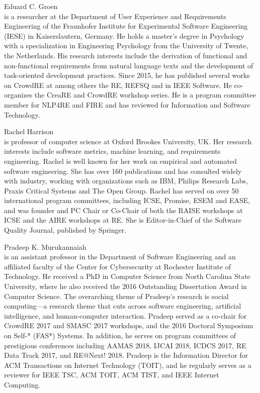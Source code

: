 \documentclass[conference,9pt]{IEEEtran}
\begin{document}
\begin{LaTeXdescription}

\item[Eduard C. Groen] \hfill\\ is a researcher at the Department of User Experience and Requirements Engineering of the Fraunhofer Institute for Experimental Software Engineering (IESE) in Kaiserslautern, Germany. He holds a master's degree in Psychology with a specialization in Engineering Psychology from the University of Twente, the Netherlands. His research interests include the derivation of functional and non-functional requirements from natural language texts and the development of task-oriented development practices. Since 2015, he has published several works on CrowdRE at among others the RE, REFSQ and in IEEE Software. He co-organizes the CreaRE and CrowdRE workshop series. He is a program committee member for NLP4RE and FIRE and has reviewed for Information and Software Technology.

\item[Rachel Harrison ] \hfill \\ is professor of computer science at Oxford Brookes University, UK. Her research interests include software metrics, machine learning, and requirements engineering. Rachel is well known for her work on empirical and automated software engineering. She has over 160 publications and has consulted widely with industry, working with organizations such as IBM, Philips Research Labs, Praxis Critical Systems and The Open Group. Rachel has served on over 50 international program committees, including ICSE, Promise, ESEM and EASE, and was founder and PC Chair or Co-Chair of both the RAISE workshops at ICSE and the AIRE workshops at RE. She is Editor-in-Chief of the Software Quality Journal, published by Springer.

\item[Pradeep K. Murukannaiah] \hfill\\ is an assistant professor in the Department of Software Engineering and an affiliated faculty of the Center for Cybersecurity at Rochester Institute of Technology. He received a PhD in Computer Science from North Carolina State University, where he also received the 2016 Outstanding Dissertation Award in Computer Science. The overarching theme of Pradeep's research is social computing---a research theme that cuts across software engineering, artificial intelligence, and human-computer interaction. Pradeep served as a co-chair for CrowdRE 2017 and SMASC 2017 workshops, and the 2016 Doctoral Symposium on Self-* (FAS*) Systems. In addition, he serves on program committees of prestigious conferences including AAMAS 2018, IJCAI 2018, ICDCS 2017, RE Data Track 2017, and RE@Next! 2018. Pradeep is the Information Director for ACM Transactions on Internet Technology (TOIT), and he regularly serves as a reviewer for IEEE TSC, ACM TOIT, ACM TIST, and IEEE Internet Computing.


\end{LaTeXdescription}
\end{document}
